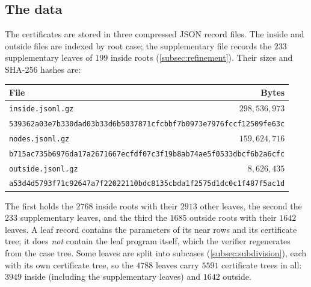 \documentclass[11pt]{amsart}
\numberwithin{equation}{section}
\theoremstyle{plain}
\theoremstyle{definition}
\theoremstyle{remark}
\newcommand{\1}{\mathbf{1}}
\begin{document}
\subsection{The data}\label{subsec:data}
The certificates are stored in three compressed JSON record files. The inside and
outside files are indexed by root case; the supplementary file records the $233$
supplementary leaves of $199$ inside roots (\cref{subsec:refinement}). Their sizes and SHA-256 hashes are:
\begin{center}
\small
\begin{tabular}{lr}
\toprule
File & Bytes \\
\midrule
\texttt{inside.jsonl.gz} & $298{,}536{,}973$ \\
\multicolumn{2}{l}{\scriptsize\texttt{539362a03e7b330dad03b33d6b5037871cfcbbf7b0973e7976fccf12509fe63c}}\\[2pt]
\texttt{nodes.jsonl.gz} & $159{,}624{,}716$ \\
\multicolumn{2}{l}{\scriptsize\texttt{b715ac735b6976da17a2671667ecfdf07c3f19b8ab74ae5f0533dbcf6b2a6cfc}}\\[2pt]
\texttt{outside.jsonl.gz} & $8{,}626{,}435$ \\
\multicolumn{2}{l}{\scriptsize\texttt{a53d4d5793f71c92647a7f22022110bdc8135cbda1f2575d1dc0c1f487f5ac1d}}\\
\bottomrule
\end{tabular}
\end{center}
The first holds the $2768$ inside roots with their $2913$ other leaves, the second the $233$
supplementary leaves, and the third the $1685$
outside roots with their $1642$ leaves. A leaf record contains the parameters of its near rows
and its certificate tree; it does \emph{not} contain the leaf program itself, which the verifier
regenerates from the case tree. Some leaves are split into subcases (\cref{subsec:subdivision}), each with
its own certificate tree, so the $4788$ leaves carry $5591$ certificate trees in all: $3949$
inside (including the supplementary leaves) and $1642$ outside.
\end{document}
